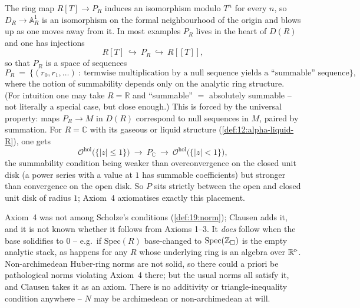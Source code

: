 \begin{remark}
\label{rmk:20:disk-motivation}
The ring map $R[T]\to P_R$ induces an isomorphism modulo $T^n$ for every $n$, so
$D_R\to\mathbb A^1_R$ is an isomorphism on the formal neighbourhood of the origin
and blows up as one moves away from it. In most examples $P_R$ lives in the heart
of $D(R)$ and one has injections
\begin{equation*}
R[T]\ \hookrightarrow\ P_R\ \hookrightarrow\ R[[T]],
\end{equation*}
so that $P_R$ is a space of sequences
\begin{equation*}
P_R\ =\ \bigl\{(r_0,r_1,\dots)\ :\ \text{termwise multiplication by a null
sequence yields a ``summable'' sequence}\bigr\},
\end{equation*}
where the notion of summability depends only on the analytic ring structure. (For
intuition one may take $R=\mathbb R$ and ``summable'' $=$ absolutely summable --
not literally a special case, but close enough.) This is forced by the universal
property: maps $P_R\to M$ in $D(R)$ correspond to null sequences in $M$, paired
by summation. For $R=\mathbb C$ with its gaseous or liquid structure
(\cref{def:12:alpha-liquid-R}), one gets
\begin{equation*}
\mathcal O^{\mathrm{hol}}\bigl(\{|z|\le1\}\bigr)\ \longrightarrow\ P_{\mathbb C}\
\longrightarrow\ \mathcal O^{\mathrm{hol}}\bigl(\{|z|<1\}\bigr),
\end{equation*}
the summability condition being weaker than overconvergence on the closed unit
disk (a power series with a value at $1$ has summable coefficients) but stronger
than convergence on the open disk. So $P$ sits strictly between the open and
closed unit disk of radius $1$; Axiom~4 axiomatises exactly this placement.
\end{remark}

\begin{remark}
\label{rmk:20:axiom4-status}
Axiom~4 was not among Scholze's conditions (\cref{def:19:norm}); Clausen adds it,
and it is not known whether it follows from Axioms 1--3. It \emph{does} follow
when the base solidifies to $0$ -- e.g.\ if $\mathrm{Spec}(R)$ base-changed to
$\mathrm{Spec}(\mathbb Z_\square)$ is the empty analytic stack, as happens for any
$R$ whose underlying ring is an algebra over $\mathbb R^{\triangleright}$. Non-archimedean
Huber-ring norms are not solid, so there could a priori be pathological norms
violating Axiom~4 there; but the usual norms all satisfy it, and Clausen takes it
as an axiom. There is no additivity or triangle-inequality condition anywhere --
$N$ may be archimedean or non-archimedean at will.
\end{remark}

